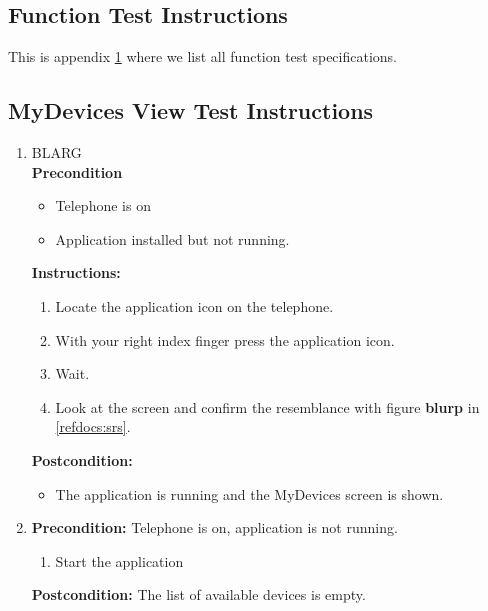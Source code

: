 \documentclass[a4paper]{article}
\newlength{\testlabellength}
\newenvironment{testlist}{\begin{enumerate}[label=\bfseries Instruction \thesubsection.\arabic* , labelindent=0pt, labelwidth=\testlabellength , leftmargin=2cm]}{\end{enumerate}}
\newenvironment{precondition}{
{\color{white}BLARG}\\ 
\textbf{Precondition}
\begin{itemize}[labelindent=0cm, labelwidth=2cm , leftmargin=1cm]
}
{\end{itemize}}
\newenvironment{instruction}{
\textbf{Instructions:}
\begin{enumerate}[label=\bfseries  \arabic*., labelindent=0cm, labelwidth=2cm , leftmargin=1cm]
}
{\end{enumerate}}
\newenvironment{postcondition}{
\textbf{Postcondition:}
\begin{itemize}[labelindent=0cm, labelwidth=2cm , leftmargin=1cm]
}
{\end{itemize}}
\begin{document}
\newpage
\begin{appendices}

\section{Function Test Instructions} \label{appendix:section:functiontest}
This is appendix \ref{appendix:section:functiontest} where we list all function test specifications.

\subsection{MyDevices View Test Instructions}
\begin{testlist}

    \item \begin{precondition}
    			\item Telephone is on
    			\item Application installed but not running.
    			\end{precondition}
    			\begin{instruction}
    				\item Locate the application icon on the telephone.
    				\item With your right index finger press the application icon.
	    			\item Wait.
    				\item Look at the screen and confirm the resemblance with figure \textbf{blurp} in \ref{refdocs:srs}.
    			\end{instruction}
    			\begin{postcondition}
    				\item The application is running and the MyDevices screen is shown.
    			\end{postcondition}
    
	\item \vspace{5mm} \textbf{Precondition:} Telephone is on, application is not running.
    			\begin{enumerate}
                	\item Start the application
                \end{enumerate}
                \textbf{Postcondition:} The list of available devices is empty.
    

\end{testlist}
\end{appendices}
\end{document}
